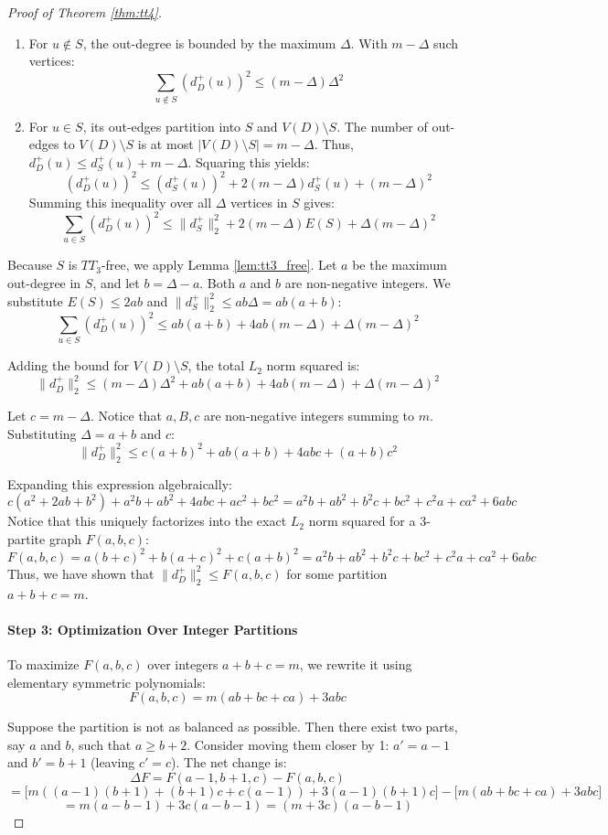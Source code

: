 \documentclass[a4paper]{amsart}
\begin{document}
\begin{proof}[Proof of Theorem \ref{thm:tt4}]
\begin{enumerate}
\item For $u \notin S$, the out-degree is bounded by the maximum $\Delta$.
With $m - \Delta$ such vertices:
\[
\sum_{u \notin S} (d^+_D(u))^2 \le (m - \Delta)\Delta^2
\]
\item For $u \in S$, its out-edges partition into $S$ and $V(D) \setminus S$.
The number of out-edges to $V(D) \setminus S$ is at most $|V(D) \setminus S| = m - \Delta$.
Thus, $d^+_D(u) \le d^+_S(u) + m - \Delta$.
Squaring this yields:
\[
(d^+_D(u))^2 \le (d^+_S(u))^2 + 2(m - \Delta)d^+_S(u) + (m - \Delta)^2
\]
Summing this inequality over all $\Delta$ vertices in $S$ gives:
\[
\sum_{u \in S} (d^+_D(u))^2 \le \|d^+_S\|_2^2 + 2(m - \Delta)E(S) + \Delta(m - \Delta)^2
\]
\end{enumerate}

Because $S$ is $TT_3$-free, we apply Lemma \ref{lem:tt3_free}.
Let $a$ be the maximum out-degree in $S$, and let $b = \Delta - a$.
Both $a$ and $b$ are non-negative integers.
We substitute $E(S) \le 2ab$ and $\|d^+_S\|_2^2 \le ab\Delta = ab(a+b)$:
\[
\sum_{u \in S} (d^+_D(u))^2 \le ab(a+b) + 4ab(m - \Delta) + \Delta(m - \Delta)^2
\]

Adding the bound for $V(D) \setminus S$, the total $L_2$ norm squared is:
\[
\|d^+_D\|_2^2 \le (m - \Delta)\Delta^2 + ab(a+b) + 4ab(m - \Delta) + \Delta(m - \Delta)^2
\]

Let $c = m - \Delta$.
Notice that $a, B, c$ are non-negative integers summing to $m$.
Substituting $\Delta = a+b$ and $c$:
\[
\|d^+_D\|_2^2 \le c(a+b)^2 + ab(a+b) + 4abc + (a+b)c^2
\]

Expanding this expression algebraically:
\[
c(a^2+2ab+b^2) + a^2b+ab^2 + 4abc + ac^2+bc^2 = a^2b + ab^2 + b^2c + bc^2 + c^2a + ca^2 + 6abc
\]
Notice that this uniquely factorizes into the exact $L_2$ norm squared for a 3-partite graph $F(a,b,c)$:
\[
F(a,b,c) = a(b+c)^2 + b(a+c)^2 + c(a+b)^2 = a^2b + ab^2 + b^2c + bc^2 + c^2a + ca^2 + 6abc
\]
Thus, we have shown that $\|d^+_D\|_2^2 \le F(a,b,c) $ for some partition $a+b+c=m$.

\paragraph{Step 3: Optimization Over Integer Partitions}
To maximize $F(a,b,c)$ over integers $a+b+c=m$, we rewrite it using elementary symmetric polynomials:
\[
F(a,b,c) = m(ab+bc+ca) + 3abc
\]

Suppose the partition is not as balanced as possible.
Then there exist two parts, say $a$ and $b$, such that $a \ge b + 2$.
Consider moving them closer by 1: $a' = a - 1$ and $b' = b + 1$ (leaving $c' = c$).
The net change is:
\[
\Delta F = F(a-1, b+1, c) - F(a,b,c)
\]
\[
= \big[m((a-1)(b+1) + (b+1)c + c(a-1)) + 3(a-1)(b+1)c\big] - \big[m(ab+bc+ca) + 3abc\big]
\]
\[
= m(a - b - 1) + 3c(a - b - 1) = (m + 3c)(a - b - 1)
\]


\end{proof}
\end{document}
